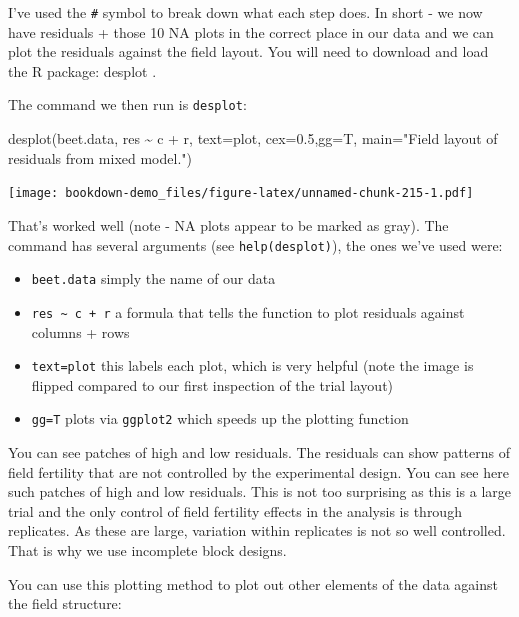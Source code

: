 \documentclass[
]{book}
\newenvironment{Shaded}{\begin{snugshade}}{\end{snugshade}}
\newcommand{\AttributeTok}[1]{\textcolor[rgb]{0.77,0.63,0.00}{#1}}
\newcommand{\FloatTok}[1]{\textcolor[rgb]{0.00,0.00,0.81}{#1}}
\newcommand{\FunctionTok}[1]{\textcolor[rgb]{0.00,0.00,0.00}{#1}}
\newcommand{\NormalTok}[1]{#1}
\newcommand{\SpecialCharTok}[1]{\textcolor[rgb]{0.00,0.00,0.00}{#1}}
\newcommand{\StringTok}[1]{\textcolor[rgb]{0.31,0.60,0.02}{#1}}
\providecommand{\tightlist}{%
  \setlength{\itemsep}{0pt}\setlength{\parskip}{0pt}}
\begin{document}
I've used the \texttt{\#} symbol to break down what each step does. In short - we now have residuals + those 10 NA plots in the correct place in our data and we can plot the residuals against the field layout. You will need to download and load the R package: desplot \citep{R-desplot}.

The command we then run is \texttt{desplot}:

\begin{Shaded}
\begin{Highlighting}[]
\FunctionTok{desplot}\NormalTok{(beet.data, res }\SpecialCharTok{\textasciitilde{}}\NormalTok{ c }\SpecialCharTok{+}\NormalTok{ r, }\AttributeTok{text=}\NormalTok{plot, }\AttributeTok{cex=}\FloatTok{0.5}\NormalTok{,}\AttributeTok{gg=}\NormalTok{T,}
        \AttributeTok{main=}\StringTok{"Field layout of residuals from mixed model."}\NormalTok{)}
\end{Highlighting}
\end{Shaded}

\texttt{[image: bookdown-demo\_files/figure-latex/unnamed-chunk-215-1.pdf]}

That's worked well (note - NA plots appear to be marked as gray). The command has several arguments (see \texttt{help(desplot)}), the ones we've used were:

\begin{itemize}
\tightlist
\item
  \texttt{beet.data} simply the name of our data
\item
  \texttt{res\ \textasciitilde{}\ c\ +\ r} a formula that tells the function to plot residuals against columns + rows
\item
  \texttt{text=plot} this labels each plot, which is very helpful (note the image is flipped compared to our first inspection of the trial layout)
\item
  \texttt{gg=T} plots via \texttt{ggplot2} which speeds up the plotting function
\end{itemize}

You can see patches of high and low residuals. The residuals can show patterns of field fertility that are not controlled by the experimental design. You can see here such patches of high and low residuals. This is not too surprising as this is a large trial and the only control of field fertility effects in the analysis is through replicates. As these are large, variation within replicates is not so well controlled. That is why we use incomplete block designs.

You can use this plotting method to plot out other elements of the data against the field structure:
\end{document}
